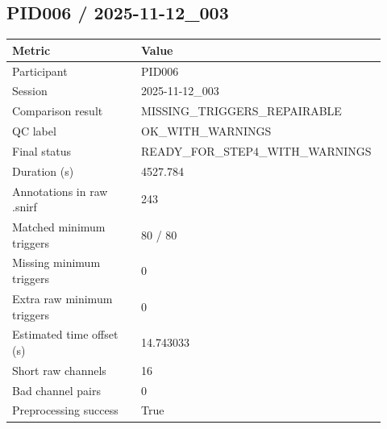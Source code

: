 \subsection*{PID006 / 2025-11-12\_003}
\begin{tabular}{p{0.34\linewidth}p{0.58\linewidth}}
\toprule
Metric & Value\\
\midrule
Participant & PID006\\
Session & 2025-11-12\_003\\
Comparison result & MISSING\_TRIGGERS\_REPAIRABLE\\
QC label & OK\_WITH\_WARNINGS\\
Final status & READY\_FOR\_STEP4\_WITH\_WARNINGS\\
Duration (s) & 4527.784\\
Annotations in raw .snirf & 243\\
Matched minimum triggers & 80 / 80\\
Missing minimum triggers & 0\\
Extra raw minimum triggers & 0\\
Estimated time offset (s) & 14.743033\\
Short raw channels & 16\\
Bad channel pairs & 0\\
Preprocessing success & True\\
\bottomrule
\end{tabular}
